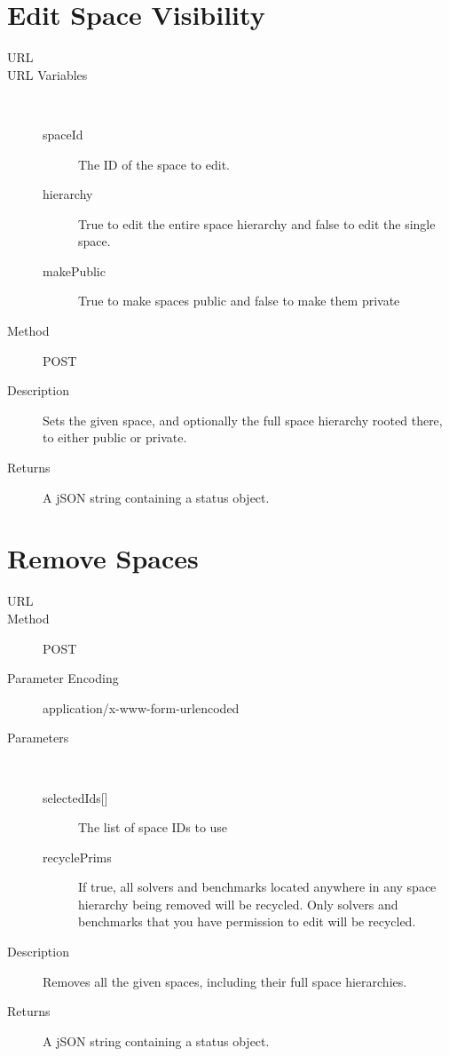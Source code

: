 \section{Edit Space Visibility}
\begin{description}
\item [URL] 
\item [URL Variables] \
	\begin{description}
	\item [spaceId]  The ID of the space to edit.
	\item [hierarchy]  True to edit the entire space hierarchy and false to edit the single space.
	\item [makePublic] \type{Boolean} True to make spaces public and false to make them private
	\end{description}
\item [Method] POST
\item [Description] Sets the given space, and optionally the full space hierarchy rooted there, to either public or private.
\item [Returns] A jSON string containing a status object.
\end{description}

\section{Remove Spaces}
\begin{description}
\item [URL] 
\item [Method] POST
\item [Parameter Encoding] application/x-www-form-urlencoded
\item [Parameters] \
	\begin{description}
	\item [{selectedIds[]}]  The list of space IDs to use
	\item [recyclePrims]  If true, all solvers and benchmarks located anywhere in any space hierarchy being removed will be recycled. Only solvers and benchmarks that you have permission to edit will be recycled.
	\end{description}
\item [Description] Removes all the given spaces, including their full space hierarchies.
\item [Returns] A jSON string containing a status object.
\end{description}
